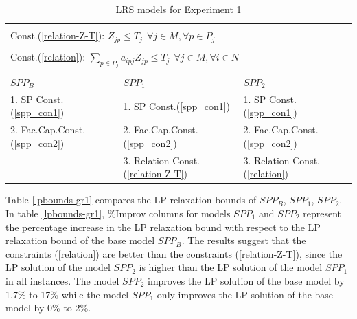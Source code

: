 \begin{table}[h]
\centering
\caption{LRS models for Experiment 1}\label{formulations-gr1}
\begin {tabular}[t]{|l|l|l|}  
\multicolumn{3}{l}{\mbox{}}\\
\multicolumn{3}{l}{Const.(\ref{relation-Z-T}): $Z_{jp} \leq T_{j} \ \ \forall j \in M, \forall p \in P_{j}$}\\
\multicolumn{3}{l}{\mbox{}}\\
\multicolumn{3}{l}{Const.(\ref{relation}): $\sum_{p \in P_{j}}a_{ipj}Z_{jp} \leq T_{j} \ \ \forall j \in M, \forall i \in N$}\\  
\multicolumn{3}{l}{\mbox{}}\\
\hline
$SPP_B$ & $SPP_1$ & $SPP_2$ \\\hline
1. SP Const.(\ref{spp_con1}) & 1. SP Const.(\ref{spp_con1}) & 1. SP Const.(\ref{spp_con1}) \\
2. Fac.Cap.Const.(\ref{spp_con2}) & 2. Fac.Cap.Const.(\ref{spp_con2}) & 2. Fac.Cap.Const.(\ref{spp_con2}) \\
\mbox{}  & 3. Relation Const.(\ref{relation-Z-T}) &  3. Relation Const.(\ref{relation})\\\hline
\end{tabular}
\end{table}

Table \ref{lpbounds-gr1} compares the LP relaxation bounds of $SPP_B$, $SPP_1$, $SPP_2$. In table 
\ref{lpbounds-gr1}, \%Improv columns for models $SPP_1$ and $SPP_2$ represent the percentage increase
in the LP relaxation bound with respect to the LP relaxation bound of the base model $SPP_B$. The results 
suggest that
the constraints (\ref{relation}) are better than the constraints (\ref{relation-Z-T}), since
the LP solution of the model $SPP_2$ is higher than the LP solution of the model $SPP_1$ in all
instances. The model $SPP_2$ improves the LP solution of the base model by 1.7\% to 17\% while 
the model $SPP_1$ only improves the LP solution of the base model by 0\% to 2\%.   

